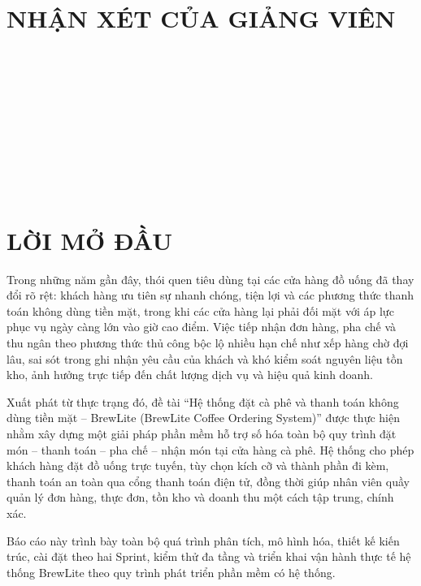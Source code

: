 \documentclass[12pt,a4paper]{report}
\begin{document}
\chapter*{NHẬN XÉT CỦA GIẢNG VIÊN}
\vspace{1cm}
\noindent\dotfill\\[1.2cm]
\noindent\dotfill\\[1.2cm]
\noindent\dotfill\\[1.2cm]
\noindent\dotfill\\[1.2cm]
\noindent\dotfill\\[1.2cm]
\noindent\dotfill\\[1.2cm]
\noindent\dotfill\\[1.2cm]
\noindent\dotfill\\[1.2cm]
\noindent\dotfill\\[1.2cm]
\noindent\dotfill
\newpage

\chapter*{LỜI MỞ ĐẦU}

Trong những năm gần đây, thói quen tiêu dùng tại các cửa hàng đồ uống đã thay đổi rõ rệt: khách hàng ưu tiên sự nhanh chóng, tiện lợi và các phương thức thanh toán không dùng tiền mặt, trong khi các cửa hàng lại phải đối mặt với áp lực phục vụ ngày càng lớn vào giờ cao điểm. Việc tiếp nhận đơn hàng, pha chế và thu ngân theo phương thức thủ công bộc lộ nhiều hạn chế như xếp hàng chờ đợi lâu, sai sót trong ghi nhận yêu cầu của khách và khó kiểm soát nguyên liệu tồn kho, ảnh hưởng trực tiếp đến chất lượng dịch vụ và hiệu quả kinh doanh.

Xuất phát từ thực trạng đó, đề tài ``Hệ thống đặt cà phê và thanh toán không dùng tiền mặt -- BrewLite (BrewLite Coffee Ordering System)'' được thực hiện nhằm xây dựng một giải pháp phần mềm hỗ trợ số hóa toàn bộ quy trình đặt món -- thanh toán -- pha chế -- nhận món tại cửa hàng cà phê. Hệ thống cho phép khách hàng đặt đồ uống trực tuyến, tùy chọn kích cỡ và thành phần đi kèm, thanh toán an toàn qua cổng thanh toán điện tử, đồng thời giúp nhân viên quầy quản lý đơn hàng, thực đơn, tồn kho và doanh thu một cách tập trung, chính xác.

Báo cáo này trình bày toàn bộ quá trình phân tích, mô hình hóa, thiết kế kiến trúc, cài đặt theo hai Sprint, kiểm thử đa tầng và triển khai vận hành thực tế hệ thống BrewLite theo quy trình phát triển phần mềm có hệ thống.
\end{document}

